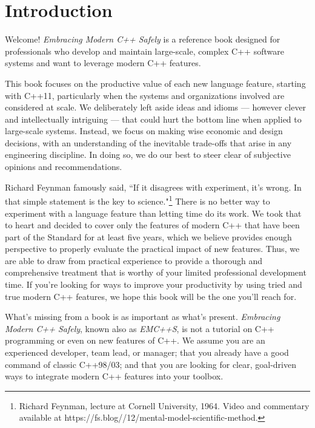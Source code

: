 


\setcounter{chapter}{-1}
\chapter[Introduction]{Introduction}\label{ch-intro}
\emcppschapterstart{}

Welcome! \textit{Embracing Modern C++ Safely} is a reference book designed for professionals who develop and maintain large-scale, complex C++ software systems and want to leverage modern C++ features.

This book focuses on the productive value of each new language feature, starting with C++11, particularly when the systems and organizations involved are considered at scale. We deliberately left aside ideas and idioms --- however clever and intellectually intriguing --- that could hurt the bottom line when applied to large-scale systems. Instead, we focus on making wise economic and design decisions, with an understanding of the inevitable trade-offs that arise in any engineering discipline. In doing so, we do our best to steer clear of subjective opinions and recommendations.

Richard Feynman famously said, ``If it disagrees with experiment, it’s wrong. In that simple statement is the key to science."\footnote{Richard Feynman, lecture at Cornell University, 1964. Video and commentary available at https://\linebreak[3]fs.\linebreak[3]blog//12/mental-model-scientific-method.} There is no better way to experiment with a language feature than letting time do its work. We took that to heart and decided to cover only the features of modern C++ that have been part of the Standard for at least five years, which we believe provides enough perspective to properly evaluate the practical impact of new features. Thus, we are able to draw from practical experience to provide a thorough and comprehensive treatment that is worthy of your limited professional development time. If you're looking for ways to improve your productivity by using tried and true modern C++ features, we hope this book will be the one you'll reach for.

What's missing from a book is as important as what's present. \textit{Embracing Modern C++ Safely}, known also as \textit{EMC++S}, is not a tutorial on C++ programming or even on new features of C++. We assume you are an experienced developer, team lead, or manager; that you already have a good command of classic C++98/03; and that you are looking for clear, goal-driven ways to integrate modern C++ features into your toolbox.

